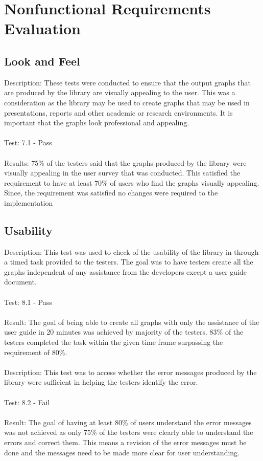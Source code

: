 \documentclass[12pt, titlepage]{article}
\begin{document}
\section{Nonfunctional Requirements Evaluation}
\subsection{Look and Feel}

Description: These tests were conducted to ensure that the output graphs that are produced by the library are visually appealing to the user. This was a consideration as the library may be used to create graphs that may be used in presentations, reports and other academic or research environments. It is important that the graphs look professional and appealing.\\\\
Test: 7.1 - Pass\\\\
Results: 75\% of the testers said that the graphs produced by the library were visually appealing in the user survey that was conducted. This satisfied the requirement to have at least 70\% of users who find the graphs visually appealing. Since, the requirement was satisfied no changes were required to the implementation


\subsection{Usability}

Description:  This test was used to check of the usability of the library in through a timed task provided to the testers. The goal was to have testers create all the graphs independent of any assistance from the developers except a user guide document. \\\\
Test: 8.1 - Pass\\\\
Result: The goal of being able to create all graphs with only the assistance of the user guide in 20 minutes was achieved by majority of the testers. 83\% of the testers completed the task within the given time frame surpassing the requirement of 80\%.\\\\
Description: This test was to access whether the error messages produced by the library were sufficient in helping the testers identify the error. \\\\
Test: 8.2 - Fail\\\\
Result: The goal of having at least 80\% of users understand the error messages was not achieved as only 75\% of the testers were clearly able to understand the errors and correct them. This means a revision of the error messages must be done and the messages need to be made more clear for user understanding.
\end{document}
